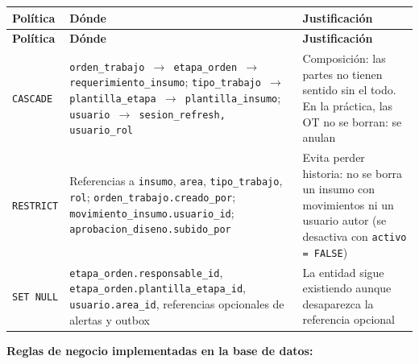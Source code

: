 \documentclass[11pt,a4paper]{article}
\begin{document}
\begingroup
\begin{longtable}{@{}>{\raggedright\arraybackslash\hspace{0pt}}p{}>{\raggedright\arraybackslash\hspace{0pt}}p{}>{\raggedright\arraybackslash\hspace{0pt}}p{}@{}}
\toprule
\textbf{Política} & \textbf{Dónde} & \textbf{Justificación} \\ \midrule
\endfirsthead
\toprule
\textbf{Política} & \textbf{Dónde} & \textbf{Justificación} \\ \midrule
\endhead
\bottomrule
\endlastfoot
\texttt{CASCADE} & \texttt{orden\_\allowbreak{}trabajo \ensuremath{\rightarrow}\allowbreak{} etapa\_\allowbreak{}orden \ensuremath{\rightarrow}\allowbreak{} requerimiento\_\allowbreak{}insumo}; \texttt{tipo\_\allowbreak{}trabajo \ensuremath{\rightarrow}\allowbreak{} plantilla\_\allowbreak{}etapa \ensuremath{\rightarrow}\allowbreak{} plantilla\_\allowbreak{}insumo}; \texttt{usuario \ensuremath{\rightarrow}\allowbreak{} sesion\_\allowbreak{}refresh, usuario\_\allowbreak{}rol} & Composición: las partes no tienen sentido sin el todo. En la práctica, las OT no se borran: se anulan \\ \addlinespace[0.25em]
\texttt{RESTRICT} & Referencias a \texttt{insumo}, \texttt{area}, \texttt{tipo\_\allowbreak{}trabajo}, \texttt{rol}; \texttt{orden\_\allowbreak{}trabajo.\allowbreak{}creado\_\allowbreak{}por}; \texttt{movimiento\_\allowbreak{}insumo.\allowbreak{}usuario\_\allowbreak{}id}; \texttt{aprobacion\_\allowbreak{}diseno.\allowbreak{}subido\_\allowbreak{}por} & Evita perder historia: no se borra un insumo con movimientos ni un usuario autor (se desactiva con \texttt{activo = FALSE}) \\ \addlinespace[0.25em]
\texttt{SET NULL} & \texttt{etapa\_\allowbreak{}orden.\allowbreak{}responsable\_\allowbreak{}id}, \texttt{etapa\_\allowbreak{}orden.\allowbreak{}plantilla\_\allowbreak{}etapa\_\allowbreak{}id}, \texttt{usuario.\allowbreak{}area\_\allowbreak{}id}, referencias opcionales de alertas y outbox & La entidad sigue existiendo aunque desaparezca la referencia opcional \\
\end{longtable}
\endgroup

\textbf{Reglas de negocio implementadas en la base de datos:}
\end{document}
